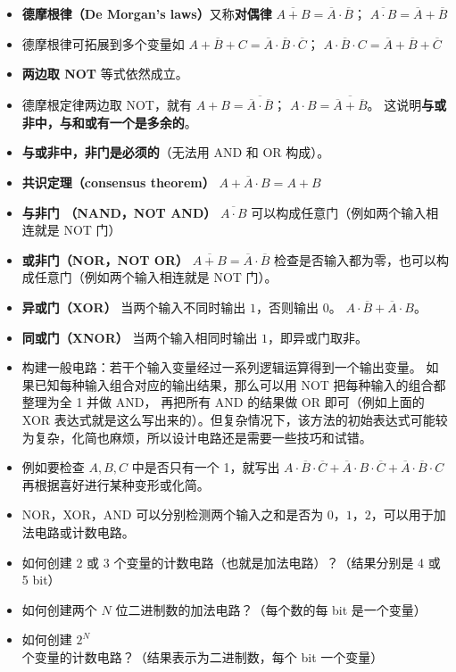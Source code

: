 \begin{itemize}
\item \textbf{德摩根律（De Morgan's laws）}又称\textbf{对偶律} $\overline{A+B} = \overline A \cdot \overline B$； $\overline{A \cdot B} = \overline A + \overline B$
\item 德摩根律可拓展到多个变量如 $\overline{A+B+C} = \overline A \cdot \overline B \cdot \overline C$； $\overline{A \cdot B\cdot C} = \overline A + \overline B + \overline C$
\item \textbf{两边取 NOT} 等式依然成立。
\item 德摩根定律两边取 NOT，就有 $A+B = \overline{\overline A \cdot \overline B}$； $A \cdot B = \overline{\overline A + \overline B}$。 这说明\textbf{与或非中，与和或有一个是多余的}。
\item \textbf{与或非中，非门是必须的}（无法用 AND 和 OR 构成）。
\item \textbf{共识定理（consensus theorem）} $A + \overline A \cdot B = A + B$
\item \textbf{与非门 （NAND，NOT AND）} $\overline{A\cdot B}$ 可以构成任意门（例如两个输入相连就是 NOT 门）
\item \textbf{或非门（NOR，NOT OR）} $\overline{A+B}=\overline A\cdot\overline B$ 检查是否输入都为零，也可以构成任意门（例如两个输入相连就是 NOT 门）。
\item \textbf{异或门（XOR）} 当两个输入不同时输出 $1$，否则输出 $0$。 $A\cdot\overline B+\overline A\cdot B$。
\item \textbf{同或门（XNOR）} 当两个输入相同时输出 $1$，即异或门取非。
\item 构建一般电路：若干个输入变量经过一系列逻辑运算得到一个输出变量。 如果已知每种输入组合对应的输出结果，那么可以用 NOT 把每种输入的组合都整理为全 1 并做 AND， 再把所有 AND 的结果做 OR 即可（例如上面的 XOR 表达式就是这么写出来的）。但复杂情况下，该方法的初始表达式可能较为复杂，化简也麻烦，所以设计电路还是需要一些技巧和试错。
\item 例如要检查 $A,B,C$ 中是否只有一个 1，就写出 $A\cdot\overline B\cdot\overline C + \overline A\cdot B\cdot\overline C + \overline A\cdot\overline B\cdot C$ 再根据喜好进行某种变形或化简。
\item NOR，XOR，AND 可以分别检测两个输入之和是否为 $0$，$1$，$2$，可以用于加法电路或计数电路。
\end{itemize}

\begin{exercise}{}
\begin{itemize}
\item 如何创建 2 或 3 个变量的计数电路（也就是加法电路）？（结果分别是 4 或 5 bit）
\item 如何创建两个 $N$ 位二进制数的加法电路？（每个数的每 bit 是一个变量）
\item 如何创建 $2^N$ 个变量的计数电路？（结果表示为二进制数，每个 bit 一个变量）
\end{itemize}
\end{exercise}
